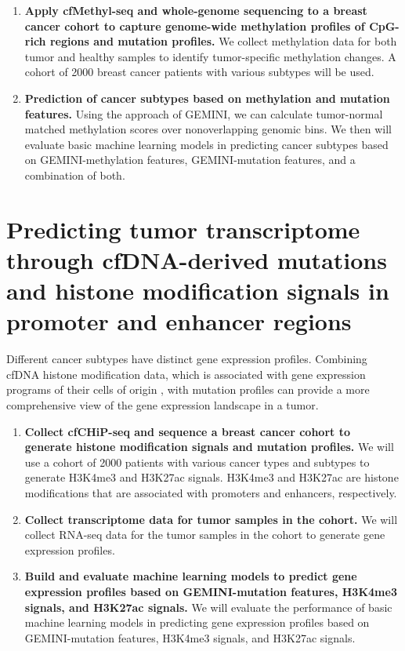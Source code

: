 \documentclass[11pt]{article}
\begin{document}
\begin{enumerate}
	\item \textbf{Apply cfMethyl-seq \cite{stackpole_cost-effective_2022} and whole-genome sequencing to a breast cancer cohort to capture genome-wide methylation profiles of CpG-rich regions and mutation profiles.} We collect methylation data for both tumor and healthy samples to identify tumor-specific methylation changes. A cohort of 2000 breast cancer patients with various subtypes will be used.
	\item \textbf{Prediction of cancer subtypes based on methylation and mutation features.}
		Using the approach of GEMINI, we can calculate tumor-normal matched methylation scores over nonoverlapping genomic bins. We then will evaluate basic machine learning models in predicting cancer subtypes based on GEMINI-methylation features, GEMINI-mutation features, and a combination of both.
\end{enumerate}

\section*{Predicting tumor transcriptome through cfDNA-derived mutations and histone modification signals in promoter and enhancer regions}
Different cancer subtypes have distinct gene expression profiles. Combining cfDNA histone modification data, which is associated with gene expression programs of their cells of origin \cite{sadeh_chip-seq_2021, trier_maansson_cell-free_2023}, with mutation profiles can provide a more comprehensive view of the gene expression landscape in a tumor.
\begin{enumerate}
	\item \textbf{Collect cfCHiP-seq \cite{baca_liquid_2023} and sequence a breast cancer cohort to generate histone modification signals and mutation profiles.} We will use a cohort of 2000 patients with various cancer types and subtypes to generate H3K4me3 and H3K27ac signals. H3K4me3 and H3K27ac are histone modifications that are associated with promoters and enhancers, respectively.
	\item \textbf{Collect transcriptome data for tumor samples in the cohort.} We will collect RNA-seq data for the tumor samples in the cohort to generate gene expression profiles.
	\item \textbf{Build and evaluate machine learning models to predict gene expression profiles based on GEMINI-mutation features, H3K4me3 signals, and H3K27ac signals.} We will evaluate the performance of basic machine learning models in predicting gene expression profiles based on GEMINI-mutation features, H3K4me3 signals, and H3K27ac signals. 
\end{enumerate}
\end{document}
